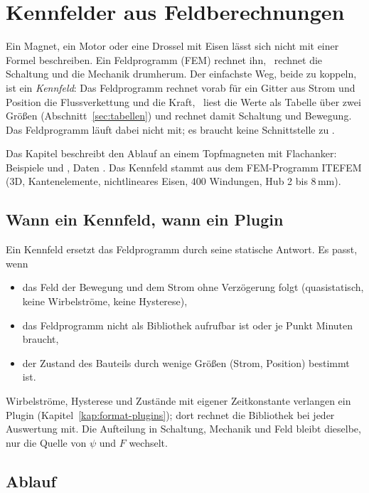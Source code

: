 \chapter{Kennfelder aus Feldberechnungen}
\label{kap:format-kennfelder}

Ein Magnet, ein Motor oder eine Drossel mit Eisen lässt sich nicht mit einer
Formel beschreiben. Ein Feldprogramm (FEM) rechnet ihn, \esim\ rechnet die
Schaltung und die Mechanik drumherum. Der einfachste Weg, beide zu koppeln, ist
ein \emph{Kennfeld}: Das Feldprogramm rechnet vorab für ein Gitter aus Strom
und Position die Flussverkettung und die Kraft, \esim\ liest die Werte als
Tabelle über zwei Größen (Abschnitt~\ref{sec:tabellen}) und rechnet damit
Schaltung und Bewegung. Das Feldprogramm läuft dabei nicht mit; es braucht
keine Schnittstelle zu \esim.

Das Kapitel beschreibt den Ablauf an einem Topfmagneten mit Flachanker:
Beispiele  und
, Daten
. Das Kennfeld stammt aus dem
FEM-Programm ITEFEM (3D, Kantenelemente, nichtlineares Eisen, 400 Windungen,
Hub 2 bis 8\,mm).

\section{Wann ein Kennfeld, wann ein Plugin}
\label{sec:kennfeld-oder-plugin}

Ein Kennfeld ersetzt das Feldprogramm durch seine statische Antwort. Es passt,
wenn

\begin{itemize}
  \item das Feld der Bewegung und dem Strom ohne Verzögerung folgt
    (quasistatisch, keine Wirbelströme, keine Hysterese),
  \item das Feldprogramm nicht als Bibliothek aufrufbar ist oder je Punkt
    Minuten braucht,
  \item der Zustand des Bauteils durch wenige Größen (Strom, Position)
    bestimmt ist.
\end{itemize}

Wirbelströme, Hysterese und Zustände mit eigener Zeitkonstante verlangen ein
Plugin (Kapitel~\ref{kap:format-plugins}); dort rechnet die Bibliothek bei
jeder Auswertung mit. Die Aufteilung in Schaltung, Mechanik und Feld bleibt
dieselbe, nur die Quelle von $\psi$ und $F$ wechselt.

\section{Ablauf}
\label{sec:kennfeld-ablauf}

